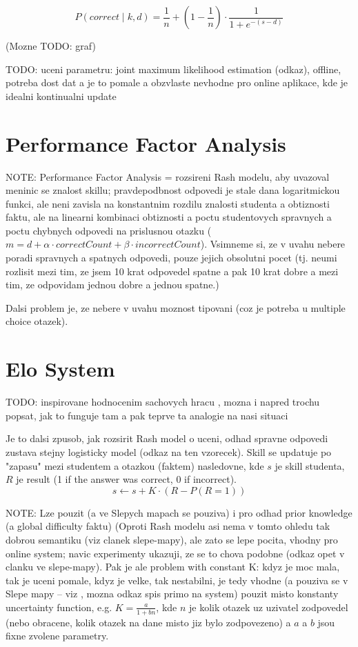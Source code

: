 \documentclass[a4paper, 12pt, twoside]{fithesis2}		%
\renewcommand{\_}{\leavevmode \kern0.07em\vbox{\hrule width0.4em}}
\newcounter{choice}
\begin{document}
$$
P(correct \mid k, d) = \frac{1}{n} + \left( 1 - \frac{1}{n} \right) \cdot \frac{1}{1 + e^{-(s - d)}}
$$

(Mozne TODO: graf)

TODO: uceni parametru: joint maximum likelihood estimation (odkaz), offline, potreba dost dat a je to pomale a obzvlaste nevhodne pro online aplikace, kde je idealni kontinualni update


\section{Performance Factor Analysis}
\label{sec:pfa}

NOTE: Performance Factor Analysis = rozsireni Rash modelu, aby uvazoval meninic se znalost skillu; pravdepodbnost odpovedi je stale dana logaritmickou funkci, ale neni zavisla na konstantnim rozdilu znalosti studenta a obtiznosti faktu, ale na linearni kombinaci obtiznosti a poctu studentovych spravnych a poctu chybnych odpovedi na prislusnou otazku ($m = d + \alpha \cdot correctCount + \beta \cdot incorrectCount$).
Vsimneme si, ze v uvahu nebere poradi spravnych a spatnych odpovedi, pouze jejich obsolutni pocet (tj. neumi rozlisit mezi tim, ze jsem 10 krat odpovedel spatne a pak 10 krat dobre a mezi tim, ze odpovidam jednou dobre a jednou spatne.)

Dalsi problem je, ze nebere v uvahu moznost tipovani (coz je potreba u multiple choice otazek).

\section{Elo System}
\label{sec:elo}


TODO: inspirovane hodnocenim sachovych hracu \cite{elo-rating}, mozna i napred trochu popsat, jak to funguje tam a pak teprve ta analogie na nasi situaci

Je to dalsi zpusob, jak rozsirit Rash model o uceni, odhad spravne odpovedi zustava stejny logisticky model (odkaz na ten vzorecek). Skill se updatuje po "zapasu" mezi studentem a otazkou (faktem) nasledovne,
kde $s$ je skill studenta, $R$ je result (1 if the answer was correct, 0 if incorrect).
$$
s \gets s + K \cdot (R - P(R = 1))
$$

NOTE: Lze pouzit (a ve Slepych mapach \cite{slepe-mapy} se pouziva) i pro odhad prior knowledge (a global difficulty faktu)
(Oproti Rash modelu asi nema v tomto ohledu tak dobrou semantiku (viz clanek slepe-mapy), ale zato se lepe pocita, vhodny pro online system; navic experimenty ukazuji, ze se to chova podobne (odkaz opet v clanku ve slepe-mapy).
Pak je ale problem with constant K: kdyz je moc mala, tak je uceni pomale, kdyz je velke, tak nestabilni, je tedy vhodne (a pouziva se v Slepe mapy -- viz \cite{slepe-mapy}, mozna odkaz spis primo na system) pouzit misto konstanty
uncertainty function, e.g. $K = \frac{a}{1 + bn}$, kde $n$ je kolik otazek uz uzivatel zodpovedel (nebo obracene, kolik otazek na dane misto jiz bylo zodpovezeno) a $a$ a $b$ jsou fixne zvolene parametry.
\end{document}
